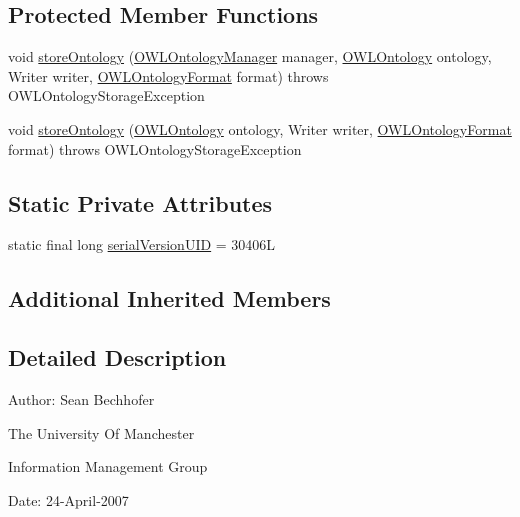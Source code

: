 \subsection*{Protected Member Functions}
\begin{DoxyCompactItemize}
\item 
void \hyperlink{classuk_1_1ac_1_1manchester_1_1owl_1_1owlapi_1_1tutorialowled2011_1_1_o_w_l_tutorial_syntax_ontology_storer_ab6e01d146719fda9d52a05b3d3b556d4}{store\-Ontology} (\hyperlink{interfaceorg_1_1semanticweb_1_1owlapi_1_1model_1_1_o_w_l_ontology_manager}{O\-W\-L\-Ontology\-Manager} manager, \hyperlink{interfaceorg_1_1semanticweb_1_1owlapi_1_1model_1_1_o_w_l_ontology}{O\-W\-L\-Ontology} ontology, Writer writer, \hyperlink{classorg_1_1semanticweb_1_1owlapi_1_1model_1_1_o_w_l_ontology_format}{O\-W\-L\-Ontology\-Format} format)  throws O\-W\-L\-Ontology\-Storage\-Exception 
\item 
void \hyperlink{classuk_1_1ac_1_1manchester_1_1owl_1_1owlapi_1_1tutorialowled2011_1_1_o_w_l_tutorial_syntax_ontology_storer_a28c14c429727e18a3567acd6684a45d4}{store\-Ontology} (\hyperlink{interfaceorg_1_1semanticweb_1_1owlapi_1_1model_1_1_o_w_l_ontology}{O\-W\-L\-Ontology} ontology, Writer writer, \hyperlink{classorg_1_1semanticweb_1_1owlapi_1_1model_1_1_o_w_l_ontology_format}{O\-W\-L\-Ontology\-Format} format)  throws O\-W\-L\-Ontology\-Storage\-Exception 
\end{DoxyCompactItemize}
\subsection*{Static Private Attributes}
\begin{DoxyCompactItemize}
\item 
static final long \hyperlink{classuk_1_1ac_1_1manchester_1_1owl_1_1owlapi_1_1tutorialowled2011_1_1_o_w_l_tutorial_syntax_ontology_storer_a640d7439147c30065be506c8d4dbc073}{serial\-Version\-U\-I\-D} = 30406\-L
\end{DoxyCompactItemize}
\subsection*{Additional Inherited Members}


\subsection{Detailed Description}
Author\-: Sean Bechhofer\par
 The University Of Manchester\par
 Information Management Group\par
 Date\-: 24-\/\-April-\/2007\par
 \par
 

